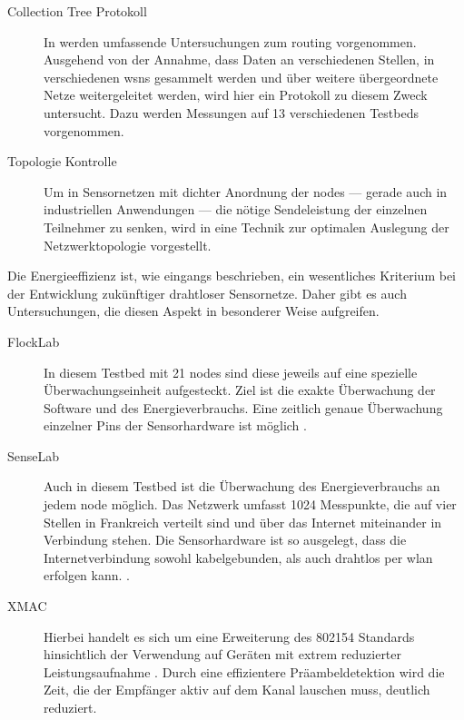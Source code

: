 \begin{description}

\item[Collection Tree Protokoll] In \cite{CTP} werden umfassende Untersuchungen zum \gls{routing} vorgenommen. Ausgehend von der Annahme, dass Daten an verschiedenen Stellen, in verschiedenen \acsp{wsn} gesammelt werden und über weitere übergeordnete Netze weitergeleitet werden, wird hier ein Protokoll zu diesem Zweck untersucht. Dazu werden Messungen auf 13 verschiedenen Testbeds vorgenommen.

\item[Topologie Kontrolle] Um in Sensornetzen mit dichter Anordnung der \glspl{node} --- gerade auch in industriellen Anwendungen --- die nötige Sendeleistung der einzelnen Teilnehmer zu senken, wird in \cite{topology} eine Technik zur optimalen Auslegung der Netzwerktopologie vorgestellt.

\end{description}
Die Energieeffizienz ist, wie eingangs beschrieben, ein wesentliches Kriterium bei der Entwicklung zukünftiger drahtloser Sensornetze. Daher gibt es auch Untersuchungen, die diesen Aspekt in besonderer Weise aufgreifen. 
\begin{description}

\item[FlockLab] In diesem Testbed mit 21 \glspl{node} sind diese jeweils auf eine spezielle Überwachungseinheit aufgesteckt. Ziel ist die exakte Überwachung der Software und des Energieverbrauchs. Eine zeitlich genaue Überwachung einzelner Pins der Sensorhardware ist möglich \cite{FlockLab}.

\item[SenseLab] Auch in diesem Testbed ist die Überwachung des Energieverbrauchs an jedem \gls{node} möglich. Das Netzwerk umfasst 1024 Messpunkte, die auf vier Stellen in Frankreich verteilt sind und über das Internet miteinander in Verbindung stehen. Die Sensorhardware ist so ausgelegt, dass die Internetverbindung sowohl kabelgebunden, als auch drahtlos per \acs{wlan} erfolgen kann. \citep{SensLAB}.

\item[XMAC] Hierbei handelt es sich um eine Erweiterung des \gls{802154} Standards hinsichtlich der Verwendung auf Geräten mit extrem reduzierter Leistungsaufnahme \cite{xmac}. Durch eine effizientere Präambeldetektion wird die Zeit, die der Empfänger aktiv auf dem Kanal lauschen muss, deutlich reduziert.

\end{description}
